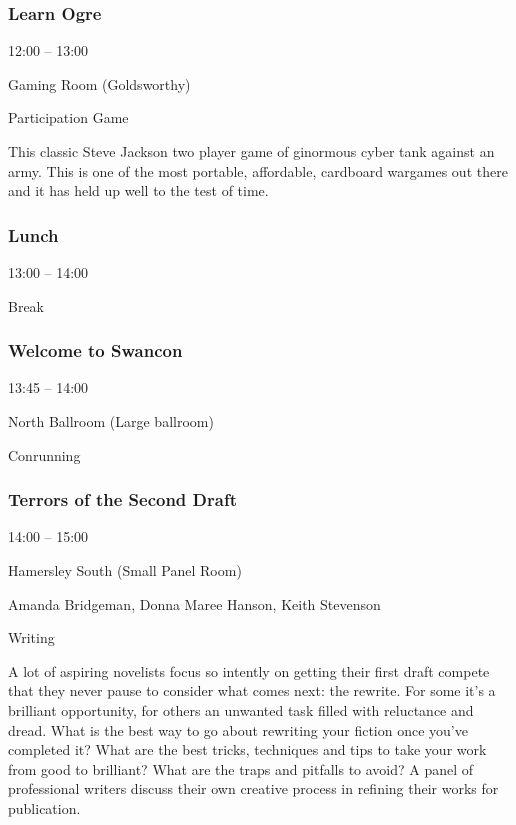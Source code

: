 \documentclass{scrreprt}
\begin{document}
\begin{multicols}{2}
\subsubsection*{Learn Ogre}\begin{description}
\setlength{\itemsep}{0pt}
\setlength{\parsep}{0pt}
\setlength{\parskip}{0pt}
\item[Time:]{12:00 -- 13:00}
\item[Venue:]{Gaming Room (Goldsworthy)}
\item[Tags:]{Participation Game}\end{description}
This classic Steve Jackson two player game of ginormous cyber tank against an army. This is one of the most portable, affordable, cardboard wargames out there and it has held up well to the test of time.
\subsubsection*{Lunch}\begin{description}
\setlength{\itemsep}{0pt}
\setlength{\parsep}{0pt}
\setlength{\parskip}{0pt}
\item[Time:]{13:00 -- 14:00}
\item[Tags:]{Break}\end{description}

\subsubsection*{Welcome to Swancon}\begin{description}
\setlength{\itemsep}{0pt}
\setlength{\parsep}{0pt}
\setlength{\parskip}{0pt}
\item[Time:]{13:45 -- 14:00}
\item[Venue:]{North Ballroom (Large ballroom)}
\item[Tags:]{Conrunning}\end{description}

\subsubsection*{Terrors of the Second Draft}\begin{description}
\setlength{\itemsep}{0pt}
\setlength{\parsep}{0pt}
\setlength{\parskip}{0pt}
\item[Time:]{14:00 -- 15:00}
\item[Venue:]{Hamersley South (Small Panel Room)}
\item[People:]{Amanda Bridgeman, Donna Maree Hanson, Keith Stevenson}
\item[Tags:]{Writing}\end{description}
A lot of aspiring novelists focus so intently on getting their first draft compete that they never pause to consider what comes next: the rewrite. For some it’s a brilliant opportunity, for others an unwanted task filled with reluctance and dread. What is the best way to go about rewriting your fiction once you’ve completed it? What are the best tricks, techniques and tips to take your work from good to brilliant? What are the traps and pitfalls to avoid? A panel of professional writers discuss their own creative process in refining their works for publication.

\end{multicols}
\end{document}
